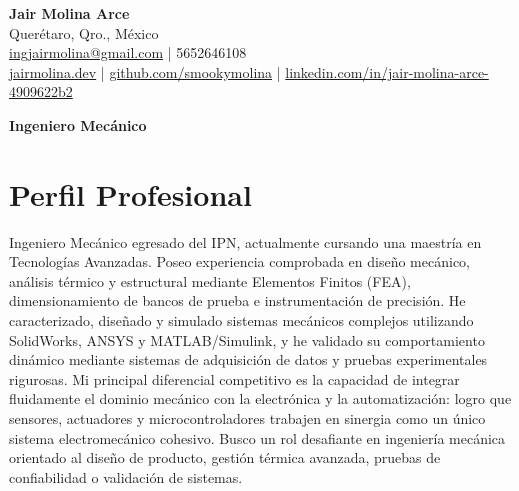 \documentclass[10pt,letterpaper]{article}
\begin{document}
\begin{center}
    {\LARGE \textbf{Jair Molina Arce}} \\ \vspace{0.5ex}
    Querétaro, Qro., México \\
    \href{mailto:ingjairmolina@gmail.com}{ingjairmolina@gmail.com} | 5652646108 \\
    \href{https://jairmolina.dev}{jairmolina.dev} | \href{https://github.com/smookymolina}{github.com/smookymolina} | \href{https://linkedin.com/in/jair-molina-arce-4909622b2}{linkedin.com/in/jair-molina-arce-4909622b2}
\end{center}

\vspace{1ex}

\begin{center}
    {\Large \textbf{Ingeniero Mecánico}}
\end{center}

\section*{Perfil Profesional}
Ingeniero Mecánico egresado del IPN, actualmente cursando una maestría en Tecnologías Avanzadas. Poseo experiencia comprobada en diseño mecánico, análisis térmico y estructural mediante Elementos Finitos (FEA), dimensionamiento de bancos de prueba e instrumentación de precisión. He caracterizado, diseñado y simulado sistemas mecánicos complejos utilizando SolidWorks, ANSYS y MATLAB/Simulink, y he validado su comportamiento dinámico mediante sistemas de adquisición de datos y pruebas experimentales rigurosas. Mi principal diferencial competitivo es la capacidad de integrar fluidamente el dominio mecánico con la electrónica y la automatización: logro que sensores, actuadores y microcontroladores trabajen en sinergia como un único sistema electromecánico cohesivo. Busco un rol desafiante en ingeniería mecánica orientado al diseño de producto, gestión térmica avanzada, pruebas de confiabilidad o validación de sistemas.
\end{document}
